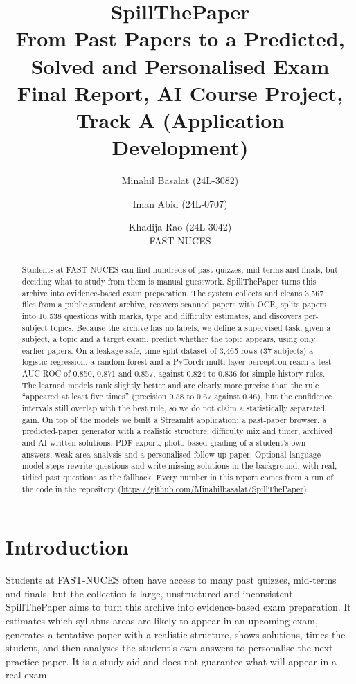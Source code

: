 \documentclass[11pt,a4paper]{article}
\title{\textbf{SpillThePaper}\\[2pt]
\large From Past Papers to a Predicted, Solved and Personalised Exam\\[2pt]
\normalsize Final Report, AI Course Project, Track A (Application Development)}
\author{Minahil Basalat (24L-3082) \and Iman Abid (24L-0707) \and Khadija Rao (24L-3042)\\[3pt]
FAST-NUCES}
\date{}
\begin{document}
\maketitle

\begin{abstract}
Students at FAST-NUCES can find hundreds of past quizzes, mid-terms and finals, but deciding what to study from them is
manual guesswork. SpillThePaper turns this archive into evidence-based exam preparation. The system collects and
cleans 3{,}567 files from a public student archive, recovers scanned papers with OCR, splits papers into 10{,}538 questions
with marks, type and difficulty estimates, and discovers per-subject topics. Because the archive has no labels, we define a
supervised task: given a subject, a topic and a target exam, predict whether the topic appears, using only earlier papers.
On a leakage-safe, time-split dataset of 3{,}465 rows (37 subjects) a logistic regression, a random forest and a PyTorch
multi-layer perceptron reach a test AUC-ROC of 0.850, 0.871 and 0.857, against 0.824 to 0.836 for simple history rules.
The learned models rank slightly better and are clearly more precise than the rule ``appeared at least five times''
(precision 0.58 to 0.67 against 0.46), but the confidence intervals still overlap with the best rule, so we do not claim
a statistically separated gain. On top of the models we built a Streamlit application: a past-paper browser, a predicted-paper
generator with a realistic structure, difficulty mix and timer, archived and AI-written solutions, PDF export, photo-based
grading of a student's own answers, weak-area analysis and a personalised follow-up paper. Optional language-model steps rewrite
questions and write missing solutions in the background, with real, tidied past questions as the fallback. Every number in this
report comes from a run of the code in the repository (\url{https://github.com/Minahilbasalat/SpillThePaper}).
\end{abstract}

\tableofcontents
\newpage

\section{Introduction}
\label{sec:intro}

Students at FAST-NUCES often have access to many past quizzes, mid-terms and finals, but the collection is large,
unstructured and inconsistent. SpillThePaper aims to turn this archive into evidence-based exam preparation. It estimates
which syllabus areas are likely to appear in an upcoming exam, generates a tentative paper with a realistic structure,
shows solutions, times the student, and then analyses the student's own answers to personalise the next practice paper.
It is a study aid and does not guarantee what will appear in a real exam.
\end{document}
